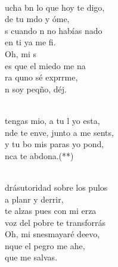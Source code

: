 \begin{cancion}%
	    \\
	ucha bn lo que hoy te digo,\\
	 de tu mdo y óme, \\
	s cuando n no habías nado \\
	 en ti ya me fi. \\
\jump
	Oh, mi s\\
	es que el miedo me na\\
	ra quno sé exprrme,\\
	n soy peqño, déj. \\\jump\\
	\begin{chorus}%
	 tengas mio, a tu l yo esta,\\
	nde te enve, junto a me sents, \\
	y  tu bo mis paras yo pond,\\
	nca te abdona.(**)\\
	\end{chorus}%
	\jump\\
	drásutoridad sobre los pulos\\
	a planr y derrir,\\
	 te alzas pues con mi erza \\
	 voz del pobre te transforrás\\
\jump
	Oh, mi snesmayaré deevo,\\
	nque el pegro me ahe,\\
	 que  me salvas.  \\\jump\\

\end{cancion}

